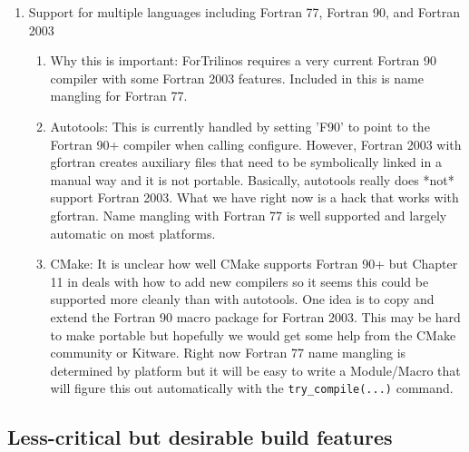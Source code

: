 \documentclass[pdf,ps2pdf,11pt]{SANDreport}
\begin{document}
\begin{enumerate}
\begin{enumerate}
  \end{enumerate}

{}\item Support for multiple languages including Fortran 77, Fortran
90, and Fortran 2003

  \begin{enumerate}

  {}\item Why this is important: ForTrilinos requires a very current
  Fortran 90 compiler with some Fortran 2003 features.  Included in
  this is name mangling for Fortran 77.

  {}\item Autotools: This is currently handled by setting 'F90' to
  point to the Fortran 90+ compiler when calling configure.  However,
  Fortran 2003 with gfortran creates auxiliary files that need to be
  symbolically linked in a manual way and it is not portable.
  Basically, autotools really does *not* support Fortran 2003.  What
  we have right now is a hack that works with gfortran.  Name mangling
  with Fortran 77 is well supported and largely automatic on most
  platforms.

  {}\item CMake: It is unclear how well CMake supports Fortran 90+ but
  Chapter 11 in {}\cite{MasteringCMake_fourth} deals with how to add
  new compilers so it seems this could be supported more cleanly than
  with autotools. One idea is to copy and extend the Fortran 90 macro
  package for Fortran 2003.  This may be hard to make portable but
  hopefully we would get some help from the CMake community or Kitware.
  Right now Fortran 77 name mangling is determined by platform but it
  will be easy to write a Module/Macro that will figure this out
  automatically with the \texttt{try\_compile(...)} command.

  \end{enumerate}

\end{enumerate}


%
{}\subsection{Less-critical but desirable build features}
%
\end{document}
